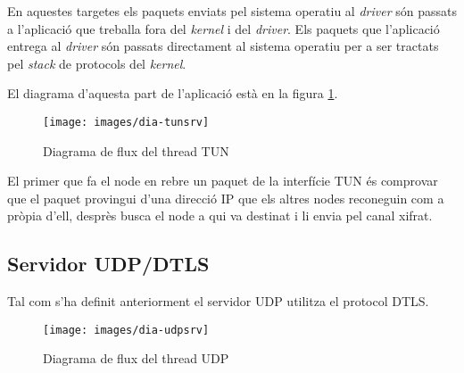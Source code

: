 En aquestes targetes els paquets enviats pel sistema operatiu al \emph{driver} són passats a l'aplicació que treballa fora del \emph{kernel} i del \emph{driver}. Els paquets que l'aplicació entrega al \emph{driver} són passats directament al sistema operatiu per a ser tractats pel \emph{stack} de protocols del \emph{kernel}.

El diagrama d'aquesta part de l'aplicació està en la figura \ref{F:dia-tunsrv}.
\begin{figure}[htb]
\centering
\texttt{[image: images/dia-tunsrv]}
\caption{Diagrama de flux del thread TUN}
\label{F:dia-tunsrv}
\end{figure}
El primer que fa el node en rebre un paquet de la interfície TUN és comprovar que el paquet provingui d'una direcció IP que els altres nodes reconeguin com a pròpia d'ell, desprès busca el node a qui va destinat i li envia pel canal xifrat.
\subsection{Servidor UDP/DTLS}
Tal com s'ha definit anteriorment el servidor UDP utilitza el protocol DTLS. %
\begin{figure}[htb]
\centering
\texttt{[image: images/dia-udpsrv]}
\caption{Diagrama de flux del thread UDP}
\label{F:dia-udpsrv}
\end{figure}
